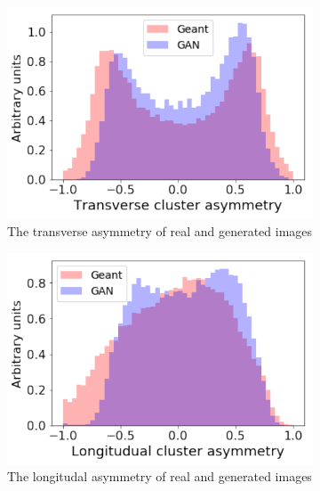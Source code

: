 \begin{figure}
  \centering
  \centering
  \begin{subfigure}{0.19\textwidth}
    \centering
    \includegraphics[width=1\textwidth]{figures/transverseAsymmetry.pdf}
    \caption{The transverse asymmetry of real and generated images}
  \end{subfigure}
  \begin{subfigure}{0.19\textwidth}
    \centering
    \includegraphics[width=1\textwidth]{figures/longAsymmetry.pdf}
    \caption{The longitudal asymmetry of real and generated images}
  \end{subfigure}
  \begin{subfigure}{0.19\textwidth}
    \centering

\end{subfigure}
\end{figure}
